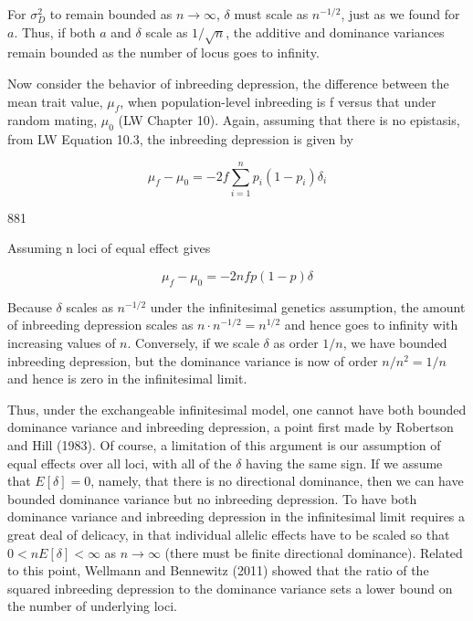 \documentclass{article}
\begin{document}
For  $ \sigma_D^2 $ to remain bounded as  $ n \to \infty $,  $ \delta $ must scale as  $ n^{-1/2} $, just as we found for  $ a $. Thus, if both  $ a $ and  $ \delta $ scale as  $ 1/\sqrt{n} $, the additive and dominance variances remain bounded as the number of locus goes to infinity.

Now consider the behavior of inbreeding depression, the difference between the mean trait value,  $ \mu_{f} $, when population-level inbreeding is f versus that under random mating,  $ \mu_{0} $ (LW Chapter 10). Again, assuming that there is no epistasis, from LW Equation 10.3, the inbreeding depression is given by

\begin{equation}
\mu_{f}-\mu_{0}=-2f\sum_{i=1}^{n}p_{i}(1-p_{i})\delta_{i}
\end{equation}

881

Assuming n loci of equal effect gives

\begin{equation}
\mu_{f}-\mu_{0}=-2n f p(1-p)\delta
\end{equation}

Because $\delta$ scales as $n^{-1/2}$ under the infinitesimal genetics assumption, the amount of inbreeding depression scales as $n \cdot n^{-1/2} = n^{1/2}$ and hence goes to infinity with increasing values of $n$. Conversely, if we scale $\delta$ as order $1/n$, we have bounded inbreeding depression, but the dominance variance is now of order $n/n^{2} = 1/n$ and hence is zero in the infinitesimal limit.

Thus, under the exchangeable infinitesimal model, one cannot have both bounded dominance variance and inbreeding depression, a point first made by Robertson and Hill (1983). Of course, a limitation of this argument is our assumption of equal effects over all loci, with all of the  $ \delta $ having the same sign. If we assume that  $ E[\delta] = 0 $, namely, that there is no directional dominance, then we can have bounded dominance variance but no inbreeding depression. To have both dominance variance and inbreeding depression in the infinitesimal limit requires a great deal of delicacy, in that individual allelic effects have to be scaled so that  $ 0 < n E[\delta] < \infty $ as  $ n \to \infty $ (there must be finite directional dominance). Related to this point, Wellmann and Bennewitz (2011) showed that the ratio of the squared inbreeding depression to the dominance variance sets a lower bound on the number of underlying loci.
\end{document}
